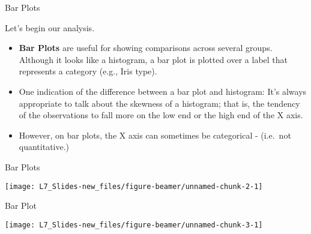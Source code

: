 \documentclass[ignorenonframetext,]{beamer}
\newenvironment{Shaded}{\begin{snugshade}}{\end{snugshade}}
\newcommand{\KeywordTok}[1]{\textcolor[rgb]{0.13,0.29,0.53}{\textbf{{#1}}}}
\newcommand{\DataTypeTok}[1]{\textcolor[rgb]{0.13,0.29,0.53}{{#1}}}
\newcommand{\DecValTok}[1]{\textcolor[rgb]{0.00,0.00,0.81}{{#1}}}
\newcommand{\StringTok}[1]{\textcolor[rgb]{0.31,0.60,0.02}{{#1}}}
\newcommand{\NormalTok}[1]{{#1}}
\begin{document}
\begin{frame}{Bar Plots}

Let's begin our analysis.

\begin{itemize}
\item
  \textbf{Bar Plots} are useful for showing comparisons across several
  groups. Although it looks like a histogram, a bar plot is plotted over
  a label that represents a category (e.g., Iris type).
\item
  One indication of the difference between a bar plot and histogram:
  It's always appropriate to talk about the skewness of a histogram;
  that is, the tendency of the observations to fall more on the low end
  or the high end of the X axis.
\item
  However, on bar plots, the X axis can sometimes be categorical -
  (i.e.~not quantitative.)
\end{itemize}

\end{frame}

\begin{frame}[fragile]{Bar Plots}

\small

\begin{Shaded}
\end{Shaded}

\begin{center}\texttt{[image: L7\_Slides-new\_files/figure-beamer/unnamed-chunk-2-1]} \end{center}

\end{frame}

\begin{frame}[fragile]{Bar Plot}

\small

\begin{Shaded}
\end{Shaded}

\begin{center}\texttt{[image: L7\_Slides-new\_files/figure-beamer/unnamed-chunk-3-1]} \end{center}

\end{frame}
\end{document}
